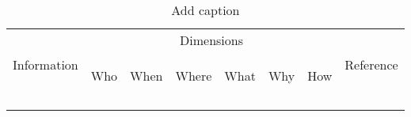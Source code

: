\begin{table}[htbp]
  \centering
  \caption{Add caption}
    \begin{tabular}{r|rrrrrr|r}
    \multicolumn{1}{c|}{\multirow{2}[3]{*}{Information}} & \multicolumn{6}{c|}{Dimensions}               & \multicolumn{1}{c}{\multirow{2}[3]{*}{Reference}} \\
\cmidrule{2-7}          & \multicolumn{1}{c}{\begin{sideways}Who\end{sideways}} & \multicolumn{1}{c}{\cellcolor[rgb]{ .906,  .902,  .902}\begin{sideways}When\end{sideways}} & \multicolumn{1}{c}{\begin{sideways}Where\end{sideways}} & \multicolumn{1}{c}{\cellcolor[rgb]{ .906,  .902,  .902}\begin{sideways}What\end{sideways}} & \multicolumn{1}{c}{\begin{sideways}Why\end{sideways}} & \multicolumn{1}{c|}{\cellcolor[rgb]{ .906,  .902,  .902}\begin{sideways}How\end{sideways}} &  \\
    \midrule
          &       & \cellcolor[rgb]{ .906,  .902,  .902} &       & \cellcolor[rgb]{ .906,  .902,  .902} &       & \cellcolor[rgb]{ .906,  .902,  .902} &  \\
    \rowcolor[rgb]{ .851,  .851,  .851}       &       &       &       &       &       &       &  \\
    \end{tabular}%
  \label{tab:addlabel}%
\end{table}%
